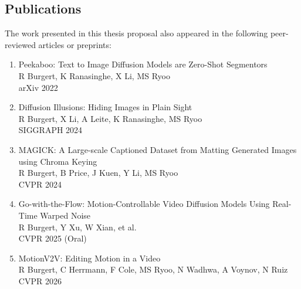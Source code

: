 \begin{center}
\noindent \chapter*{Publications}
\end{center}

\vspace{-20pt}
\noindent The work presented in this thesis proposal also appeared in the following peer-reviewed articles or preprints:\\

\begin{enumerate}
    \item Peekaboo: Text to Image Diffusion Models are Zero-Shot Segmentors \\
    R Burgert, K Ranasinghe, X Li, MS Ryoo \\
    arXiv 2022

    \item Diffusion Illusions: Hiding Images in Plain Sight \\
    R Burgert, X Li, A Leite, K Ranasinghe, MS Ryoo \\
    SIGGRAPH 2024

    \item MAGICK: A Large-scale Captioned Dataset from Matting Generated Images using Chroma Keying \\
    R Burgert, B Price, J Kuen, Y Li, MS Ryoo \\
    CVPR 2024

    \item Go-with-the-Flow: Motion-Controllable Video Diffusion Models Using Real-Time Warped Noise \\
    R Burgert, Y Xu, W Xian, et al. \\
    CVPR 2025 (Oral)

    \item MotionV2V: Editing Motion in a Video \\
    R Burgert, C Herrmann, F Cole, MS Ryoo, N Wadhwa, A Voynov, N Ruiz \\
    CVPR 2026

\end{enumerate}

\cleardoublepage
